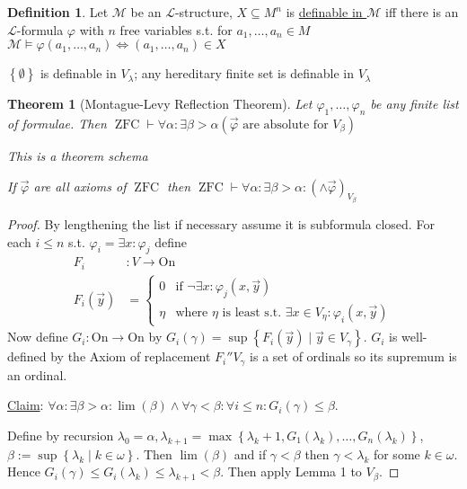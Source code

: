 \documentclass{scrartcl}
\renewcommand{\L}{\mathcal{L}}
\newcommand{\set}[1]{\left\{#1\right\}}
\DeclareMathOperator{\ZFC}{ZFC}
\theoremstyle{definition}
\newtheorem*{definition*}{Definition}
\theoremstyle{plain}
\newtheorem*{theorem*}{Theorem}
\theoremstyle{remark}
\begin{document}
	\begin{definition*}
		Let $\mathcal{M}$ be an $\L$-structure, $X \subseteq M^n$ is \underline{definable in $\mathcal{M}$} iff there is an $\L$-formula $\varphi$ with $n$ free variables s.t. for $a_1, \dots, a_n \in M$ $\mathcal{M}\vDash \varphi(a_1, \dots, a_n) \iff (a_1, \dots, a_n) \in X$ 
	\end{definition*}
		
	$\set{\emptyset}$ is definable in $V_\lambda$; any hereditary finite set is definable in $V_\lambda$
	
	
	\begin{theorem*}[Montague-Levy Reflection Theorem]
		Let $\varphi_1, \dots, \varphi_n$ be any finite list of formulae. Then $\ZFC \vdash \forall \alpha: \exists \beta > \alpha (\vec{\varphi} \text{ are absolute for } V_\beta)$
		
		This is a theorem schema
		
		If $\vec{\varphi}$ are all axioms of $\ZFC$ then $\ZFC \vdash \forall \alpha: \exists \beta > \alpha: (\land \vec{\varphi})_{V_\beta}$
	\end{theorem*}

	\begin{proof}
		By lengthening the list if necessary assume it is subformula closed. For each $i \leq n$ s.t. $\varphi_i = \exists x: \varphi_j$ define 
		\begin{align*}
			F_i &: V \to \text{On}\\
			F_i(\vec{y}) &= \begin{cases}
				0 & \text{if } \lnot \exists x: \varphi_j(x, \vec{y})\\
				\eta & \text{where } \eta \text{ is least s.t. } \exists x \in V_\eta: \varphi_i(x, \vec{y})
			\end{cases}
		\end{align*}
		Now define $G_i: \text{On} \to \text{On}$ by $G_i(\gamma) = \sup \set{F_i(\vec{y}) \mid \vec{y} \in V_\gamma}$. $G_i$ is well-defined by the Axiom of replacement $F_i''V_\gamma$ is a set of ordinals so its supremum is an ordinal.
		
		\underline{Claim}: $\forall \alpha: \exists \beta > \alpha: \lim(\beta) \land \forall \gamma < \beta: \forall i \leq n: G_i(\gamma) \leq \beta$.
		
		Define by recursion $\lambda_0 = \alpha, \lambda_{k+1} = \max\set{\lambda_k + 1, G_1(\lambda_k), \dots, G_n(\lambda_k)}$,  $\beta:= \sup\set{\lambda_k\mid k \in \omega}$. Then $\lim(\beta)$
		and if $\gamma < \beta$ then $\gamma < \lambda_k$ for some $k \in \omega$. Hence $G_i(\gamma) \leq G_i(\lambda_k) \leq \lambda_{k+1} < \beta$. Then apply Lemma 1 to $V_\beta$.
	\end{proof}
\end{document}
